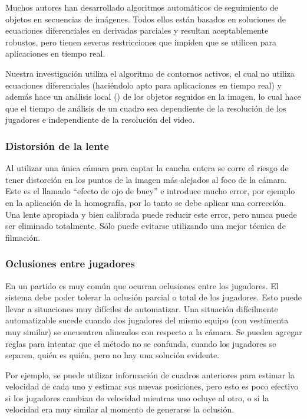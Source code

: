 Muchos autores han desarrollado algoritmos automáticos de seguimiento de
objetos en secuencias de imágenes\cite{IFTrace, alp, local-learning, MHT-2}.
Todos ellos están basados en soluciones de ecuaciones diferenciales en
derivadas parciales y resultan aceptablemente robustos, pero tienen severas
restricciones que impiden que se utilicen para aplicaciones en tiempo real.

Nuestra investigación utiliza el algoritmo de contornos
activos\cite{fast-level-set}, el cual no utiliza ecuaciones diferenciales
(haciéndolo apto para aplicaciones en tiempo real) y además hace un análisis
local () de los objetos seguidos en la imagen, lo cual hace que el tiempo de
análisis de un cuadro sea dependiente de la resolución de los jugadores e
independiente de la resolución del video.

\subsubsection{Distorsión de la lente}

Al utilizar una única cámara para captar la cancha entera se corre el riesgo de
tener distorción en los puntos de la imagen más alejados al foco de la cámara.
Este es el llamado ``efecto de ojo de buey'' e introduce mucho error, por ejemplo
en la aplicación de la homografía, por lo
tanto se debe aplicar una corrección. Una lente apropiada y bien calibrada
puede reducir este error, pero nunca puede ser eliminado totalmente. Sólo
puede evitarse utilizando una mejor técnica de filmación.

\subsubsection{Oclusiones entre jugadores}

En un partido es muy común que ocurran oclusiones entre los jugadores. El
sistema debe poder tolerar la oclusión parcial o total de los jugadores.
Esto puede llevar a situaciones muy difíciles de automatizar. Una situación
difícilmente automatizable sucede cuando dos jugadores del mismo equipo (con
vestimenta muy similar) se encuentren alineados con respecto a la cámara.
Se pueden agregar reglas para intentar que el método no se confunda, cuando
los jugadores se separen, quién es quién, pero no hay una solución evidente.

Por ejemplo, se puede utilizar información de cuadros anteriores para
estimar la velocidad de cada uno y estimar sus nuevas posiciones, pero esto
es poco efectivo si los jugadores cambian de velocidad mientras uno ocluye
al otro, o si la velocidad era muy similar al momento de generarse la oclusión.

